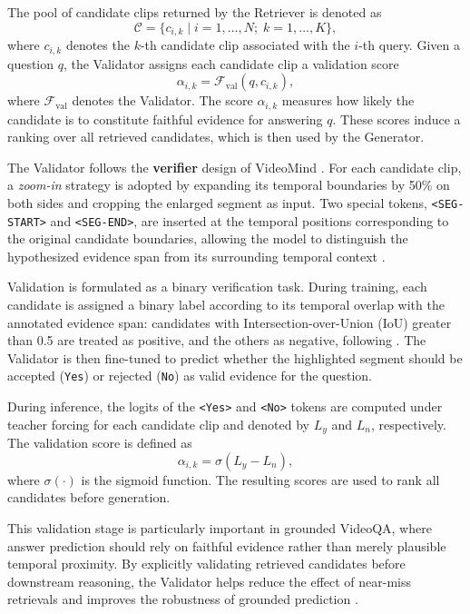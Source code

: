 The pool of candidate clips returned by the Retriever is denoted as
\begin{equation}
\mathcal{C}=\{c_{i,k}\mid i=1,\dots,N;\;k=1,\dots,K\},
\end{equation}
where $c_{i,k}$ denotes the $k$-th candidate clip associated with the $i$-th query. Given a question $q$, the Validator assigns each candidate clip a validation score
\begin{equation}
\alpha_{i,k} = \mathcal{F}_{\text{val}}(q, c_{i,k}),
\end{equation}
\noindent
where $\mathcal{F}_{\text{val}}$ denotes the Validator. The score $\alpha_{i,k}$ measures how likely the candidate is to constitute faithful evidence for answering $q$. These scores induce a ranking over all retrieved candidates, which is then used by the Generator.

The Validator follows the \textbf{verifier} design of VideoMind \cite{liu2025videomind}. For each candidate clip, a \emph{zoom-in} strategy is adopted by expanding its temporal boundaries by 50\% on both sides and cropping the enlarged segment as input. Two special tokens, \texttt{<SEG-START>} and \texttt{<SEG-END>}, are inserted at the temporal positions corresponding to the original candidate boundaries, allowing the model to distinguish the hypothesized evidence span from its surrounding temporal context \cite{liu2025videomind}.

Validation is formulated as a binary verification task. During training, each candidate is assigned a binary label according to its temporal overlap with the annotated evidence span: candidates with Intersection-over-Union (IoU) greater than 0.5 are treated as positive, and the others as negative, following \cite{liu2025videomind}. The Validator is then fine-tuned to predict whether the highlighted segment should be accepted (\texttt{Yes}) or rejected (\texttt{No}) as valid evidence for the question.

During inference, the logits of the \texttt{<Yes>} and \texttt{<No>} tokens are computed under teacher forcing for each candidate clip and denoted by $L_y$ and $L_n$, respectively. The validation score is defined as
\begin{equation}
\alpha_{i,k} = \sigma(L_y - L_n),
\end{equation}
where $\sigma(\cdot)$ is the sigmoid function. The resulting scores are used to rank all candidates before generation.


This validation stage is particularly important in grounded VideoQA, where answer prediction should rely on faithful evidence rather than merely plausible temporal proximity. By explicitly validating retrieved candidates before downstream reasoning, the Validator helps reduce the effect of near-miss retrievals and improves the robustness of grounded prediction \cite{xiao2024can,liu2025videomind}. 

